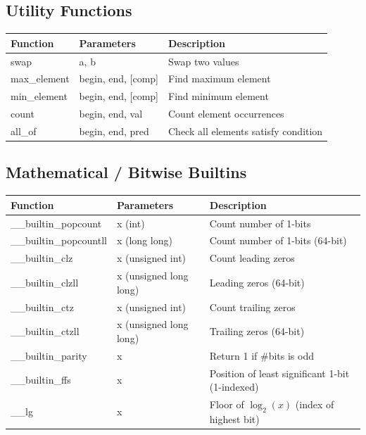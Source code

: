 \documentclass[10pt]{article}
\begin{document}
\begin{multicols*}{2}
\subsection*{Utility Functions}
\begin{tabularx}{\linewidth}{|l|l|X|}
    \hline
    \textbf{Function} & \textbf{Parameters} & \textbf{Description} \\
    \hline
    swap & a, b & Swap two values \\
    \hline
    max\_element & begin, end, [comp] & Find maximum element \\
    \hline
    min\_element & begin, end, [comp] & Find minimum element \\
    \hline
    count & begin, end, val & Count element occurrences \\
    \hline
    all\_of & begin, end, pred & Check all elements satisfy condition \\
    \hline
\end{tabularx}

\subsection*{Mathematical / Bitwise Builtins}
\begin{tabularx}{\linewidth}{|l|l|X|}
    \hline
    \textbf{Function} & \textbf{Parameters} & \textbf{Description} \\
    \hline
    \_\_builtin\_popcount & x (int) & Count number of 1-bits \\
    \hline
    \_\_builtin\_popcountll & x (long long) & Count number of 1-bits (64-bit) \\
    \hline
    \_\_builtin\_clz & x (unsigned int) & Count leading zeros \\
    \hline
    \_\_builtin\_clzll & x (unsigned long long) & Leading zeros (64-bit) \\
    \hline
    \_\_builtin\_ctz & x (unsigned int) & Count trailing zeros \\
    \hline
    \_\_builtin\_ctzll & x (unsigned long long) & Trailing zeros (64-bit) \\
    \hline
    \_\_builtin\_parity & x & Return 1 if \#bits is odd \\
    \hline
    \_\_builtin\_ffs & x & Position of least significant 1-bit (1-indexed) \\
    \hline
    \_\_lg & x & Floor of $\log_2(x)$ (index of highest bit) \\
    \hline
\end{tabularx}


\end{multicols*}
\end{document}
